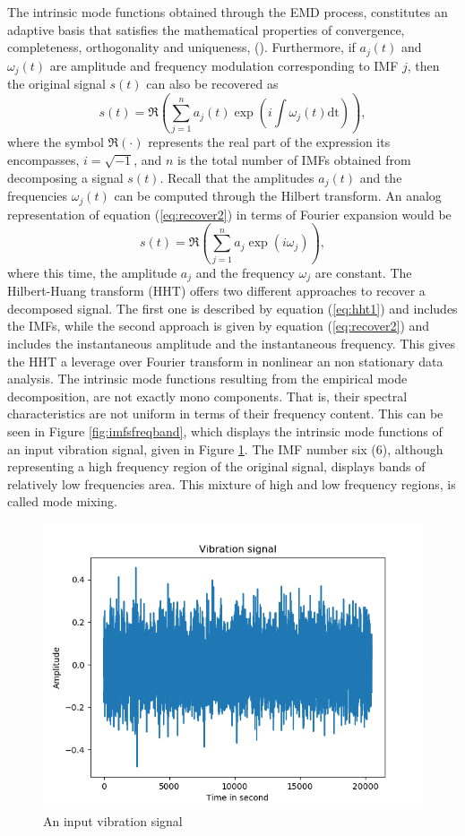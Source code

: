 \documentclass[../Main/thesis.tex]{subfiles}
\begin{document}
\justify
The intrinsic mode functions obtained through the EMD process, constitutes an adaptive basis that satisfies the mathematical properties of convergence, completeness, orthogonality and uniqueness, (\cite{huang98}). Furthermore, if $a_{j}(t)$ and $\omega_{j}(t)$ are amplitude and frequency modulation corresponding to IMF $j$, then the original signal $s(t)$ can also be recovered as 
\begin{equation}\label{eq:recover2}
s(t) = \Re{\left( \sum_{j=1}^{n}a_{j}(t)\exp\left(i\int\omega_{j}(t)\mathrm{dt}\right)  \right)},
\end{equation} 
where the symbol $\Re(\cdot)$ represents the real part of the expression its encompasses, $i=\sqrt{-1}$, and $n$ is the total number of IMFs obtained from decomposing a signal $s(t)$. Recall that the amplitudes $a_{j}(t)$ and the frequencies $\omega_{j}(t)$ can be computed through the Hilbert transform. An analog representation of equation (\ref{eq:recover2}) in terms of Fourier expansion would be 
\begin{equation}\label{eq:recoverFourier}
s(t) = \Re{\left( \sum_{j=1}^{n}a_{j}\exp\left(i\omega_{j}\right)  \right)},
\end{equation} 
where this time, the amplitude $a_{j}$ and the frequency $\omega_{j}$ are constant. The Hilbert-Huang transform (HHT) offers two different approaches to recover a decomposed signal. The first one is described by equation (\ref{eq:hht1}) and includes the IMFs, while the second approach is given by equation (\ref{eq:recover2}) and includes the instantaneous amplitude and the instantaneous frequency. This gives the HHT a leverage over Fourier transform in nonlinear an non stationary data analysis.
\justify
The intrinsic mode functions resulting from the empirical mode decomposition, are not exactly mono components. That is, their spectral characteristics are not uniform in terms of their frequency content. This can be seen in Figure \ref{fig:imfsfreqband}, which displays the intrinsic mode functions of an input vibration signal, given in Figure \ref{fig:input}. The IMF number six (6), although representing a high frequency region of the original signal, displays bands of relatively low frequencies area. This mixture of high and low frequency regions, is called mode mixing.
\begin{figure}[H]
	\centering
	\includegraphics[width=0.8\linewidth]{../fig/input}
	\caption{An input vibration signal}
	\label{fig:input}
\end{figure}
\end{document}
